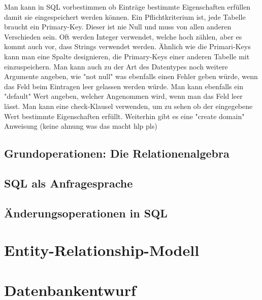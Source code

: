 \documentclass[12pt,a4paper]{article} %
\begin{document}
	Man kann in SQL vorbestimmen ob Einträge bestimmte Eigenschaften erfüllen damit sie eingespeichert werden können. Ein Pflichtkriterium ist, jede Tabelle braucht ein Primary-Key. Dieser ist nie Null und muss von allen anderen Verschieden sein. Oft werden Integer verwendet, welche hoch zählen, aber es kommt auch vor, dass Strings verwendet werden. Ähnlich wie die Primari-Keys kann man eine Spalte designieren, die Primary-Keys einer anderen Tabelle mit einzuspeichern. Man kann auch zu der Art des Datentypes noch weitere Argumente angeben, wie "not null" was ebenfalls einen Fehler geben würde, wenn das Feld beim Eintragen leer gelassen werden würde. Man kann ebenfalls ein "default" Wert angeben, welcher Angenommen wird, wenn man das Feld leer lässt. Man kann eine check-Klausel verwenden, um zu sehen ob der eingegebene Wert bestimmte Eigenschaften erfüllt. Weiterhin gibt es eine "create domain" Anweisung (keine ahnung was das macht hlp pls)
	
	
	
	\subsection{Grundoperationen: Die Relationenalgebra}
	
	\subsection{SQL als Anfragesprache}
	
	\subsection{Änderungsoperationen in SQL}
	
	\newpage
	\section{Entity-Relationship-Modell}
	
	\newpage
	\section{Datenbankentwurf}
	
\end{document}
